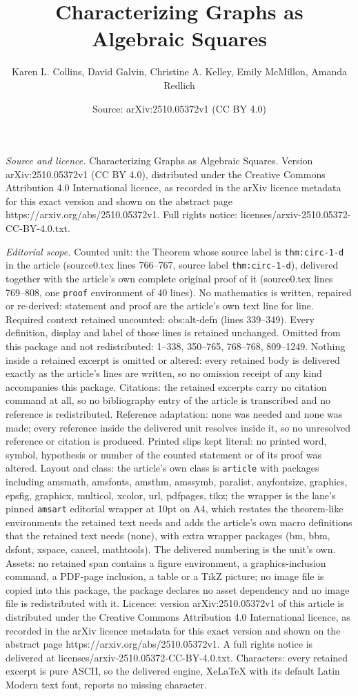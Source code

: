\documentclass[10pt,a4paper]{amsart}
\title[Characterizing Graphs as Algebraic Squares]{Characterizing Graphs as Algebraic Squares}
\author{Karen L. Collins, David Galvin, Christine A. Kelley, Emily McMillon, Amanda Redlich}
\date{Source: arXiv:2510.05372v1 (CC BY 4.0)}
\begin{document}
\maketitle

\noindent\emph{Source and licence.} Characterizing Graphs as Algebraic Squares. Version arXiv:2510.05372v1 (CC BY 4.0), distributed under the Creative Commons Attribution 4.0 International licence, as recorded in the arXiv licence metadata for this exact version and shown on the abstract page https://arxiv.org/abs/2510.05372v1. Full rights notice: licenses/arxiv-2510.05372-CC-BY-4.0.txt.\par\smallskip

\noindent\textit{Editorial scope.} Counted unit: the Theorem whose source label is \texttt{thm:circ-1-d} in the article (source0.tex lines 766--767, source label \texttt{thm:circ-1-d}), delivered together with the article's own complete original proof of it (source0.tex lines 769--808, one \texttt{proof} environment of 40 lines). No mathematics is written, repaired or re-derived: statement and proof are the article's own text line for line. Required context retained uncounted: obs:alt-defn (lines 339--349). Every definition, display and label of those lines is retained unchanged. Omitted from this package and not redistributed: 1--338, 350--765, 768--768, 809--1249. Nothing inside a retained excerpt is omitted or altered: every retained body is delivered exactly as the article's lines are written, so no omission receipt of any kind accompanies this package. Citations: the retained excerpts carry no citation command at all, so no bibliography entry of the article is transcribed and no reference is redistributed. Reference adaptation: none was needed and none was made; every reference inside the delivered unit resolves inside it, so no unresolved reference or citation is produced. Printed slips kept literal: no printed word, symbol, hypothesis or number of the counted statement or of its proof was altered. Layout and class: the article's own class is \texttt{article} with packages including amsmath, amsfonts, amsthm, amssymb, paralist, anyfontsize, graphics, epsfig, graphicx, multicol, xcolor, url, pdfpages, tikz; the wrapper is the lane's pinned \texttt{amsart} editorial wrapper at 10pt on A4, which restates the theorem-like environments the retained text needs and adds the article's own macro definitions that the retained text needs (none), with extra wrapper packages (bm, bbm, dsfont, xspace, cancel, mathtools). The delivered numbering is the unit's own. Assets: no retained span contains a figure environment, a graphics-inclusion command, a PDF-page inclusion, a table or a TikZ picture; no image file is copied into this package, the package declares no asset dependency and no image file is redistributed with it. Licence: version arXiv:2510.05372v1 of this article is distributed under the Creative Commons Attribution 4.0 International licence, as recorded in the arXiv licence metadata for this exact version and shown on the abstract page https://arxiv.org/abs/2510.05372v1. A full rights notice is delivered at licenses/arxiv-2510.05372-CC-BY-4.0.txt. Characters: every retained excerpt is pure ASCII, so the delivered engine, XeLaTeX with its default Latin Modern text font, reports no missing character.
\end{document}
